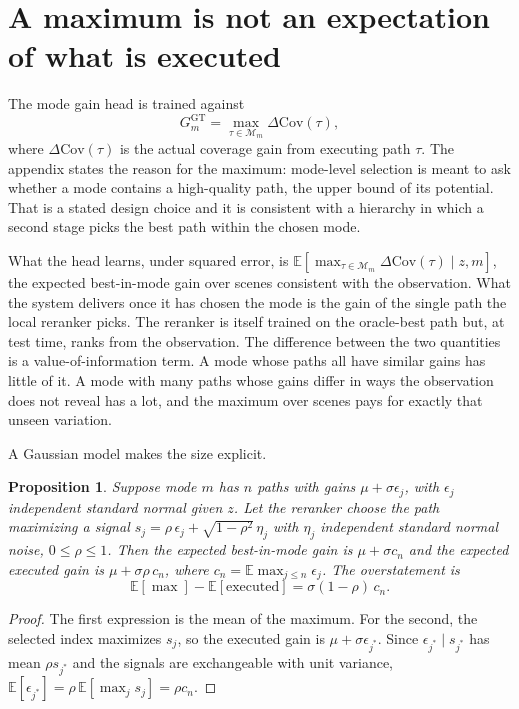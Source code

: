 \documentclass[11pt]{article}
\newtheorem{proposition}{Proposition}
\theoremstyle{definition}
\newcommand{\E}{\mathbb{E}}
\begin{document}
\section{A maximum is not an expectation of what is executed}
\label{sec:max}

The mode gain head is trained against
\begin{equation}
G_m^{\mathrm{GT}}=\max_{\tau\in\mathcal M_m}\Delta\mathrm{Cov}(\tau),
\label{eq:target}
\end{equation}
where $\Delta\mathrm{Cov}(\tau)$ is the actual coverage gain from executing path $\tau$. The appendix states the reason for the maximum: mode-level selection is meant to ask whether a mode contains a high-quality path, the upper bound of its potential. That is a stated design choice and it is consistent with a hierarchy in which a second stage picks the best path within the chosen mode.

What the head learns, under squared error, is $\E[\max_{\tau\in\mathcal M_m}\Delta\mathrm{Cov}(\tau)\mid z,m]$, the expected best-in-mode gain over scenes consistent with the observation. What the system delivers once it has chosen the mode is the gain of the single path the local reranker picks. The reranker is itself trained on the oracle-best path but, at test time, ranks from the observation. The difference between the two quantities is a value-of-information term. A mode whose paths all have similar gains has little of it. A mode with many paths whose gains differ in ways the observation does not reveal has a lot, and the maximum over scenes pays for exactly that unseen variation.

A Gaussian model makes the size explicit.

\begin{proposition}
Suppose mode $m$ has $n$ paths with gains $\mu+\sigma\epsilon_j$, with $\epsilon_j$ independent standard normal given $z$. Let the reranker choose the path maximizing a signal $s_j=\rho\,\epsilon_j+\sqrt{1-\rho^2}\,\eta_j$ with $\eta_j$ independent standard normal noise, $0\le\rho\le1$. Then the expected best-in-mode gain is $\mu+\sigma c_n$ and the expected executed gain is $\mu+\sigma\rho\, c_n$, where $c_n=\E\max_{j\le n}\epsilon_j$. The overstatement is
\begin{equation}
\E[\max]-\E[\text{executed}]=\sigma(1-\rho)\,c_n .
\end{equation}
\end{proposition}

\begin{proof}
The first expression is the mean of the maximum. For the second, the selected index maximizes $s_j$, so the executed gain is $\mu+\sigma\epsilon_{j^\ast}$. Since $\epsilon_{j^\ast}\mid s_{j^\ast}$ has mean $\rho s_{j^\ast}$ and the signals are exchangeable with unit variance, $\E[\epsilon_{j^\ast}]=\rho\,\E[\max_j s_j]=\rho c_n$.
\end{proof}
\end{document}
